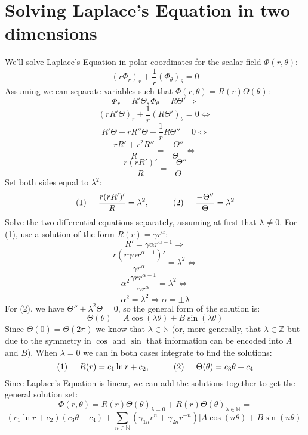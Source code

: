 \documentclass[a4paper,10pt]{article}
\begin{document}
\thispagestyle{empty}
\section*{Solving Laplace's Equation in two dimensions}
We'll solve Laplace's Equation in polar coordinates for the scalar field $\Phi(r, \theta)$:
\[ \left( r \Phi_r \right)_r + \frac{1}{r} \left(\Phi_\theta \right)_\theta = 0 \]
Assuming we can separate variables such that $\Phi(r, \theta) = R(r)\Theta(\theta)$:
\[ \Phi_r = R'\Theta, \Phi_\theta = R\Theta' \Rightarrow \]
\[ (rR'\Theta)_r + \frac{1}{r}(R\Theta')_\theta = 0 \Leftrightarrow \]
\[ R'\Theta + rR''\Theta + \frac{1}{r}R\Theta'' = 0 \Leftrightarrow \]
\[ \frac{rR' + r^2 R''}{R} = \frac{- \Theta''}{\Theta} \Leftrightarrow \]
\[ \frac{r(rR')'}{R} = \frac{- \Theta''}{\Theta} \]
Set both sides equal to $\lambda^2$:
\[ (1) \hspace{0.5cm} \frac{r(rR')'}{R} = \lambda^2, \hspace{1cm} (2) \hspace{0.5cm} \frac{- \Theta''}{\Theta} = \lambda^2 \]
Solve the two differential equations separately, assuming at first that $\lambda \neq 0$. 
For (1), use a solution of the form $R(r) = \gamma r^\alpha$:
\[ R' = \gamma \alpha r^{\alpha - 1} \Rightarrow \]
\[ \frac{r(r\gamma \alpha r^{\alpha - 1})'}{\gamma r^\alpha} = \lambda^2 \Leftrightarrow \]
\[ \alpha^2 \frac{\gamma r r^{\alpha - 1}}{\gamma r^\alpha} = \lambda^2 \Leftrightarrow \]
\[ \alpha^2 = \lambda^2 \Rightarrow \alpha = \pm \lambda \]
For (2), we have $\Theta'' + \lambda^2 \Theta = 0$, so the general form of the solution is:
\[ \Theta(\theta) = A \cos(\lambda \theta) + B \sin(\lambda \theta) \]
Since $\Theta(0) = \Theta(2\pi)$ we know that $\lambda \in \mathbb{N}$ (or, more generally,
that $\lambda \in \mathbb{Z}$ but due to the symmetry in $\cos$ and $\sin$ that information can be encoded into $A$ and $B$).
When $\lambda = 0$ we can in both cases integrate to find the solutions:
\[ (1) \hspace{0.5cm} R(r) = c_1 \ln r + c_2,\hspace{1cm} (2)\hspace{0.5cm} \Theta(\theta) = c_3 \theta + c_4 \]
Since Laplace's Equation is linear, we can add the solutions together to get the general solution set:
\[ \Phi(r, \theta) = R(r)\Theta(\theta)_{\lambda = 0} + R(r)\Theta(\theta)_{\lambda \in \mathbb{N}} = \]
\[ (c_1 \ln r + c_2)(c_3 \theta + c_4) + \sum_{n \in \mathbb{N}} (\gamma_{1n} r^n + \gamma_{2n} r^{-n}) 
\big[A \cos(n \theta) + B \sin(n \theta) \big] \]
\newpage
\thispagestyle{empty}
\end{document}
